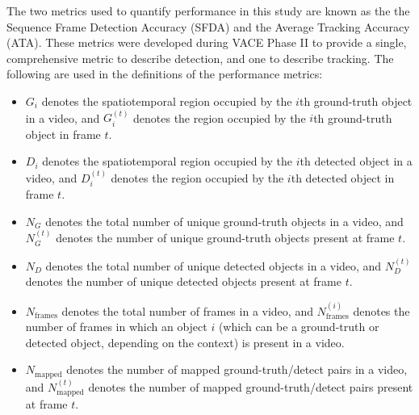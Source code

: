 \documentclass{article}
\begin{document}
The two metrics used to quantify performance in this study are known as the the Sequence Frame Detection Accuracy (SFDA) and the Average Tracking Accuracy (ATA). These metrics were developed during VACE Phase II to provide a single, comprehensive metric to describe detection, and one to describe tracking. The following are used in the definitions of the performance metrics:
\begin{itemize}
\renewcommand{\labelitemi}{$\bullet$}
\item $G_{i}$ denotes the spatiotemporal region occupied by the $i$th ground-truth object in a video, and $G_{i}^{(t)}$ denotes the region occupied by the $i$th ground-truth object in frame $t$.
\vspace{2mm}
\item $D_{i}$ denotes the spatiotemporal region occupied by the $i$th detected object in a video, and $D_{i}^{(t)}$ denotes the region occupied by the $i$th detected object in frame $t$.
\vspace{2mm}
\item $N_{G}$ denotes the total number of unique ground-truth objects in a video, and $N_{G}^{(t)}$ denotes the number of unique ground-truth objects present at frame $t$.
\vspace{2mm}
\item $N_{D}$ denotes the total number of unique detected objects in a video, and $N_{D}^{(t)}$ denotes the number of unique detected objects present at frame $t$.
\vspace{2mm}
\item $N_{\text{frames}}$ denotes the total number of frames in a video, and $N_{\text{frames}}^{(i)}$ denotes the number of frames in which an object $i$ (which can be a ground-truth or detected object, depending on the context) is present in a video.
\vspace{2mm}
\item $N_{\text{mapped}}$ denotes the number of mapped ground-truth/detect pairs in a video, and $N_{\text{mapped}}^{(t)}$ denotes the number of mapped ground-truth/detect pairs present at frame $t$.
\vspace{1mm}
\end{itemize}
\end{document}

